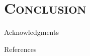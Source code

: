 \documentclass[xcolor=x11names,compress]{beamer}
\theoremstyle{plain}
\renewcommand{\(}{\begin{columns}}
\renewcommand{\)}{\end{columns}}
\newcommand{\<}[1]{\begin{column}{#1}}
\renewcommand{\>}{\end{column}}
\begin{document}
\section{\scshape Conclusion}


\begin{frame}{\insertsection}
	
\end{frame}


\begin{frame}{Acknowledgments}
	
\end{frame}


\begin{frame}[allowframebreaks]{References}
	
	\tiny
	
	
	
\end{frame}
\end{document}
